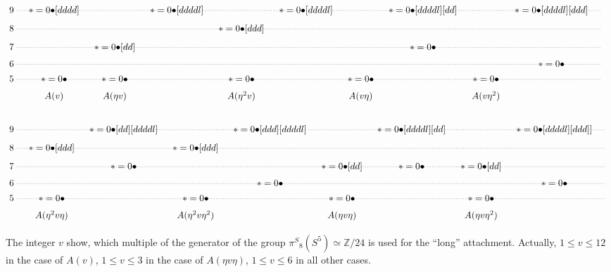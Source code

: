 \documentclass[12pt,a4paper]{amsart}
\theoremstyle{definition}
\theoremstyle{remark}
\numberwithin{equation}{section}
\begin{document}
\begin{table}[!htp]
  \caption{}\vspace*{-1.5em}
 \begin{align*}
   &\xymatrix@R=.4em@C=1em{
     9 \ar@{.}[rrrrrrrrrr] & {*=0{\bullet}} {\ar@{-}}[dddd] &&  {*=0{\bullet}} {\ar@{-}}[ddddl] &&
     {*=0{\bullet}} {\ar@{-}}[ddddl] && {*=0{\bullet}} {\ar@{-}}[ddddl] {\ar@{-}}[dd] && {*=0{\bullet}}
     {\ar@{-}}[ddddl] {\ar@{-}}[ddd] & \\
     8 \ar@{.}[rrrrrrrrrr] &&&& {*=0{\bullet}} {\ar@{-}}[ddd] &&&&&& \\
     7 \ar@{.}[rrrrrrrrrr] && {*=0{\bullet}} {\ar@{-}}[dd] &&&&& {*=0{\bullet}} &&& \\
     6 \ar@{.}[rrrrrrrrrr] &&&&&&&&& {*=0{\bullet}} & \\
     5 \ar@{.}[rrrrrrrrrr] & {*=0{\bullet}} & {*=0{\bullet}} && {*=0{\bullet}} && {*=0{\bullet}} && {*=0{\bullet}} && \\
     & A(v) & A(\eta v)&& A(\eta^2v) && A(v\eta) && A(v\eta^2)
     } \\
   \\
    & \xymatrix@R=.4em@C=1em{
     9 \ar@{.}[rrrrrrrrr] && {*=0{\bullet}} {\ar@{-}}[dd] {\ar@{-}}[ddddl] &&  {*=0{\bullet}}
     {\ar@{-}}[ddd] {\ar@{-}}[ddddl] && {*=0{\bullet}} {\ar@{-}}[ddddl] {\ar@{-}}[dd] && {*=0{\bullet}}
     {\ar@{-}}[ddddl] {\ar@{-}}[ddd]] & \\
     8 \ar@{.}[rrrrrrrrr] & {*=0{\bullet}} {\ar@{-}}[ddd] && {*=0{\bullet}} {\ar@{-}}[ddd]
     &&&&&& \\
     7 \ar@{.}[rrrrrrrrr] && {*=0{\bullet}}  &&& {*=0{\bullet}}  {\ar@{-}}[dd] & {*=0{\bullet}} &{*=0{\bullet}}
     {\ar@{-}}[dd] && \\ 
     6 \ar@{.}[rrrrrrrrr] &&&& {*=0{\bullet}} &&&& {*=0{\bullet}} & \\
     5 \ar@{.}[rrrrrrrrr] & {*=0{\bullet}} && {*=0{\bullet}} && {*=0{\bullet}} && {*=0{\bullet}} &&  \\
     & A(\eta^2 v\eta) && A(\eta^2 v\eta^2)&& A(\eta v\eta)
     && A(\eta v\eta^2) &&
     } \\
  \end{align*}
  \end{table}
 The integer $v$ show, which multiple of the generator of the group
   ${\pi^S}_8(S^5)\simeq{\mathbb Z}/24$ is used for the ``long'' attachment. Actually,
  $ 1\le v\le12$ in the case of $A(v)$, $1\le v\le 3$ in the case
 of $A(\eta v\eta)$, $1\le v\le 6$ in all other cases.   
 
\end{document}

